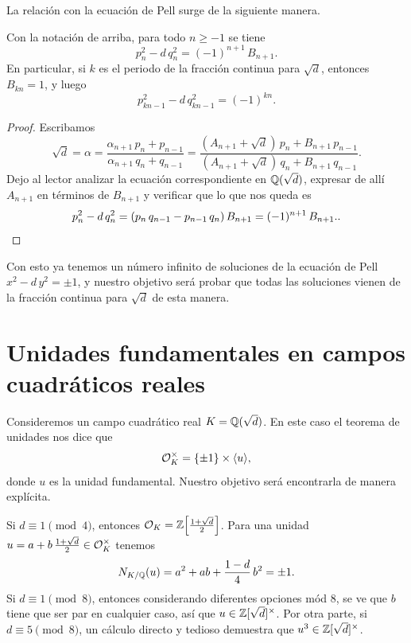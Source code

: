 La relación con la ecuación de Pell surge de la siguiente manera.

\begin{proposicion}
  Con la notación de arriba, para todo $n \ge -1$ se tiene
  $$p_n^2 - d\,q_n^2 = (-1)^{n+1}\,B_{n+1}.$$
  En particular, si $k$ es el periodo de la fracción continua para $\sqrt{d}$,
  entonces $B_{kn} = 1$, y luego
  $$p_{kn - 1}^2 - d\,q_{kn-1}^2 = (-1)^{kn}.$$

  \begin{proof}
    Escribamos
    \[ \sqrt{d} = \alpha =
       \frac{\alpha_{n+1}\,p_n + p_{n-1}}{\alpha_{n+1}\,q_n + q_{n-1}} =
       \frac{(A_{n+1} + \sqrt{d})\,p_n + B_{n+1}\,p_{n-1}}{(A_{n+1} + \sqrt{d})\,q_n + B_{n+1}\,q_{n-1}}. \]
    Dejo al lector analizar la ecuación correspondiente en $\mathbb{Q} (\sqrt{d})$,
    expresar de allí $A_{n+1}$ en términos de $B_{n+1}$ y verificar que lo que
    nos queda es
    \[ p_n^2 - d\,q_n^2 =
       (p_n\,q_{n-1} - p_{n-1}\,q_n)\,B_{n+1} = (-1)^{n+1}\,B_{n+1}. \qedhere. \]
  \end{proof}
\end{proposicion}

Con esto ya tenemos un número infinito de soluciones de la ecuación de Pell
$x^2 - d\,y^2 = \pm 1$, y nuestro objetivo será probar que todas las soluciones
vienen de la fracción continua para $\sqrt{d}$ de esta manera.


\section{Unidades fundamentales en campos cuadráticos reales}

Consideremos un campo cuadrático real $K = \mathbb{Q} (\sqrt{d})$. En este caso el
teorema de unidades nos dice que
$$\mathcal{O}_K^\times = \{ \pm 1 \} \times \langle u\rangle,$$
donde $u$ es la unidad fundamental. Nuestro objetivo será encontrarla de manera
explícita.

Si $d \equiv 1 \pmod{4}$, entonces
$\mathcal{O}_K = \mathbb{Z} \Bigl[\frac{1+\sqrt{d}}{2}\Bigr]$. Para una unidad
$u = a + b\,\frac{1+\sqrt{d}}{2} \in \mathcal{O}_K^\times$ tenemos
$$N_{K/\mathbb{Q}} (u) = a^2 + ab + \frac{1 - d}{4}\,b^2 = \pm 1.$$
Si $d \equiv 1 \pmod{8}$, entonces considerando diferentes opciones mód $8$,
se ve que $b$ tiene que ser par en cualquier caso, así que
$u \in \mathbb{Z} [\sqrt{d}]^\times$. Por otra parte, si $d \equiv 5 \pmod{8}$, un
cálculo directo y tedioso demuestra que $u^3 \in \mathbb{Z} [\sqrt{d}]^\times$.

